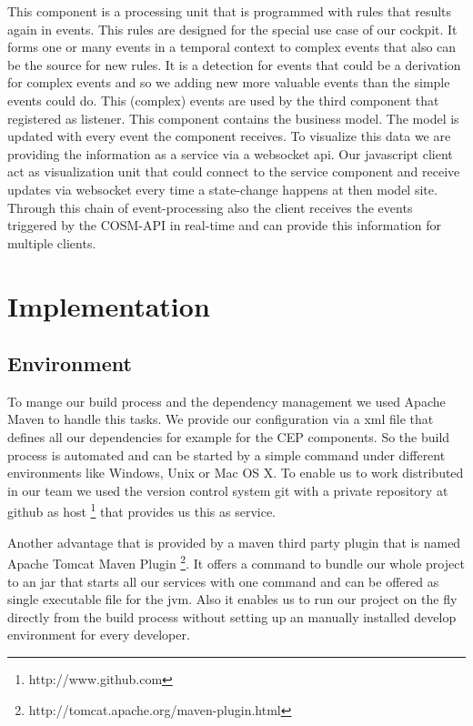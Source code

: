 \documentclass{acm_proc_article-sp}
\begin{document}

This component is a processing unit that is programmed with rules that results again in events. This rules are designed for the special use case of our cockpit. It forms one or many events in a temporal context to complex events that also can be the source for new rules. It is a detection for events that could be a derivation for complex events and so we adding new more valuable events than the simple events could do.
This (complex) events are used by the third component that registered as listener.
This component contains the business model. The model is updated with every event the component receives. 
To visualize this data we are providing the information as a service via a websocket api.
Our javascript client act as visualization unit that could connect to the service component and receive updates via websocket every time a state-change happens at then model site.
Through this chain of event-processing also the client receives the events triggered by the COSM-API in real-time and can provide this information for multiple clients.

\section{Implementation}
\label{sec:Implementation}

\subsection{Environment}
To mange our build process and the dependency management we used Apache Maven to handle this tasks. We provide our configuration via a xml file that defines all our  dependencies for example for the CEP components.
So the build process is automated and can be started by a simple command under different environments like Windows, Unix or Mac OS X.
To enable us to work distributed in our team we used the version control system git with a private repository at github as host
\footnote{http://www.github.com}
that provides us this as service.

Another advantage that is provided by a maven third party plugin that is named Apache Tomcat Maven Plugin
\footnote{http://tomcat.apache.org/maven-plugin.html}.
It offers a command to bundle our whole project to an jar that starts all our services with one command and can be offered as single executable file for the jvm.
Also it enables us to run our project on the fly directly from the build process without setting up an manually installed develop environment for every developer.
\end{document}

